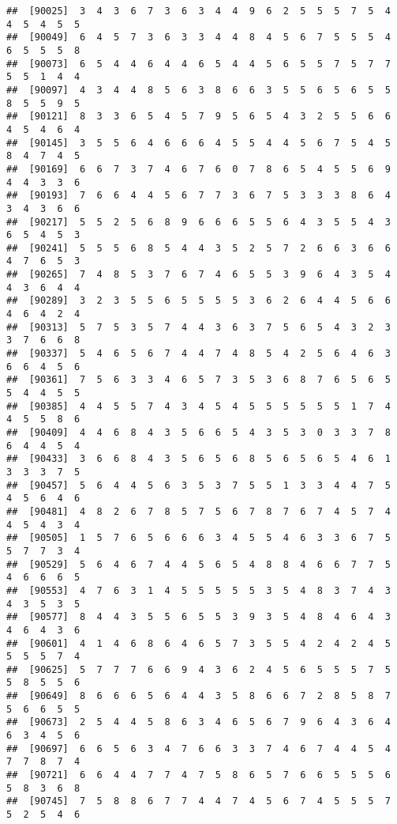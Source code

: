 \documentclass[
]{book}
\begin{document}
\begin{verbatim}
##  [90025]  3  4  3  6  7  3  6  3  4  4  9  6  2  5  5  5  7  5  4  4  5  4  5  5
##  [90049]  6  4  5  7  3  6  3  3  4  4  8  4  5  6  7  5  5  5  4  6  5  5  5  8
##  [90073]  6  5  4  4  6  4  4  6  5  4  4  5  6  5  5  7  5  7  7  5  5  1  4  4
##  [90097]  4  3  4  4  8  5  6  3  8  6  6  3  5  5  6  5  6  5  5  8  5  5  9  5
##  [90121]  8  3  3  6  5  4  5  7  9  5  6  5  4  3  2  5  5  6  6  4  5  4  6  4
##  [90145]  3  5  5  6  4  6  6  6  4  5  5  4  4  5  6  7  5  4  5  8  4  7  4  5
##  [90169]  6  6  7  3  7  4  6  7  6  0  7  8  6  5  4  5  5  6  9  4  4  3  3  6
##  [90193]  7  6  6  4  4  5  6  7  7  3  6  7  5  3  3  3  8  6  4  3  4  3  6  6
##  [90217]  5  5  2  5  6  8  9  6  6  6  5  5  6  4  3  5  5  4  3  6  5  4  5  3
##  [90241]  5  5  5  6  8  5  4  4  3  5  2  5  7  2  6  6  3  6  6  4  7  6  5  3
##  [90265]  7  4  8  5  3  7  6  7  4  6  5  5  3  9  6  4  3  5  4  4  3  6  4  4
##  [90289]  3  2  3  5  5  6  5  5  5  5  3  6  2  6  4  4  5  6  6  4  6  4  2  4
##  [90313]  5  7  5  3  5  7  4  4  3  6  3  7  5  6  5  4  3  2  3  3  7  6  6  8
##  [90337]  5  4  6  5  6  7  4  4  7  4  8  5  4  2  5  6  4  6  3  6  6  4  5  6
##  [90361]  7  5  6  3  3  4  6  5  7  3  5  3  6  8  7  6  5  6  5  5  4  4  5  5
##  [90385]  4  4  5  5  7  4  3  4  5  4  5  5  5  5  5  5  1  7  4  4  5  5  8  6
##  [90409]  4  4  6  8  4  3  5  6  6  5  4  3  5  3  0  3  3  7  8  6  4  4  5  4
##  [90433]  3  6  6  8  4  3  5  6  5  6  8  5  6  5  6  5  4  6  1  3  3  3  7  5
##  [90457]  5  6  4  4  5  6  3  5  3  7  5  5  1  3  3  4  4  7  5  4  5  6  4  6
##  [90481]  4  8  2  6  7  8  5  7  5  6  7  8  7  6  7  4  5  7  4  4  5  4  3  4
##  [90505]  1  5  7  6  5  6  6  6  3  4  5  5  4  6  3  3  6  7  5  5  7  7  3  4
##  [90529]  5  6  4  6  7  4  4  5  6  5  4  8  8  4  6  6  7  7  5  4  6  6  6  5
##  [90553]  4  7  6  3  1  4  5  5  5  5  5  3  5  4  8  3  7  4  3  4  3  5  3  5
##  [90577]  8  4  4  3  5  5  6  5  5  3  9  3  5  4  8  4  6  4  3  4  6  4  3  6
##  [90601]  4  1  4  6  8  6  4  6  5  7  3  5  5  4  2  4  2  4  5  5  5  5  7  4
##  [90625]  5  7  7  7  6  6  9  4  3  6  2  4  5  6  5  5  5  7  5  5  8  5  5  6
##  [90649]  8  6  6  6  5  6  4  4  3  5  8  6  6  7  2  8  5  8  7  5  6  6  5  5
##  [90673]  2  5  4  4  5  8  6  3  4  6  5  6  7  9  6  4  3  6  4  6  3  4  5  6
##  [90697]  6  6  5  6  3  4  7  6  6  3  3  7  4  6  7  4  4  5  4  7  7  8  7  4
##  [90721]  6  6  4  4  7  7  4  7  5  8  6  5  7  6  6  5  5  5  6  5  8  3  6  8
##  [90745]  7  5  8  8  6  7  7  4  4  7  4  5  6  7  4  5  5  5  7  5  2  5  4  6

\end{verbatim}
\end{document}
